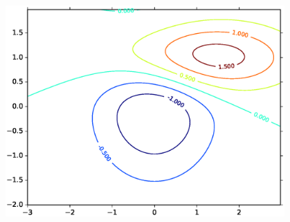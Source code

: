 \documentclass{beamer}
\begin{document}
\begin{frame}
  \frametitle{\insertsection}
  \framesubtitle{\insertsubsection}
  \includegraphics[width=0.8\textwidth]{border.eps}  
\end{frame}
\end{document}
